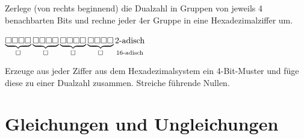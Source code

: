 Zerlege (von rechts beginnend) die Dualzahl in Gruppen von jeweils 4 benachbarten Bits und rechne jeder 4er Gruppe in eine Hexadezimalziffer um.

$\underbrace{\square\square\square\square}_\square\underbrace{\square\square\square\square}_\square\underbrace{\square\square\square\square}_\square\underbrace{\square\square\square\square}_\square {\color{white}\underbrace{\color{black}\text{2-adisch}}_{\color{black}\text{16-adisch}}}$

Erzeuge aus jeder Ziffer aus dem Hexadezimalsystem ein 4-Bit-Muster und füge diese zu einer Dualzahl zusammen. Streiche führende Nullen.

\chapter{Gleichungen und Ungleichungen}
